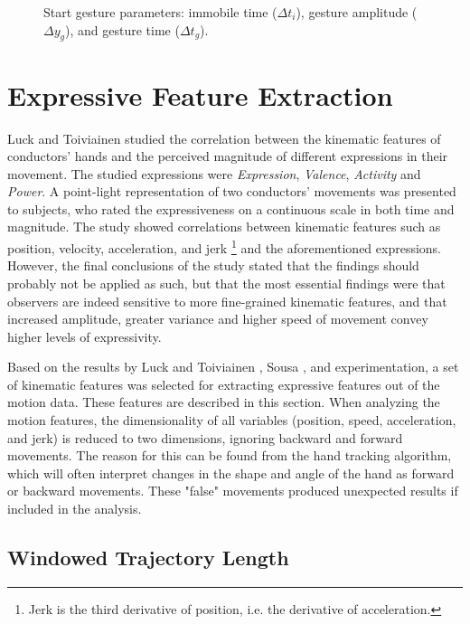 \begin{figure}
\begin{center}

\caption{
Start gesture parameters:
immobile time ($\Delta t_i$),
gesture amplitude ($\Delta y_g$), and
gesture time ($\Delta t_g$).
}
\label{fig:start_gesture}
\end{center}
\end{figure}

\section{Expressive Feature Extraction}
\label{sec:expressive_feature_extraction}

Luck and Toiviainen \cite{luck2010}
studied the correlation between the kinematic features of conductors' hands
and the perceived magnitude of different expressions in their movement.
The studied expressions were
\textit{Expression}, \textit{Valence}, \textit{Activity} and \textit{Power}.
A point-light representation of two conductors' movements
was presented to subjects, who rated the expressiveness
on a continuous scale in both time and magnitude.
The study showed correlations between kinematic features
such as position, velocity, acceleration, and jerk%
\footnote{Jerk is the third derivative of position,
i.e. the derivative of acceleration.}
and the aforementioned expressions.
However, the final conclusions of the study stated that
the findings should probably not be applied as such,
but that the most essential findings were that observers
are indeed sensitive to more fine-grained kinematic features,
and that increased amplitude, greater variance and higher speed of movement
convey higher levels of expressivity.

Based on the results by Luck and Toiviainen \cite{luck2010},
Sousa \cite{sousa1988},
and experimentation,
a set of kinematic features was selected for extracting
expressive features out of the motion data.
These features are described in this section.
When analyzing the motion features,
the dimensionality of all variables
(position, speed, acceleration, and jerk)
is reduced to two dimensions,
ignoring backward and forward movements.
The reason for this can be found from the
hand tracking algorithm,
which will often interpret changes in
the shape and angle of the hand
as forward or backward movements.
These "false" movements produced unexpected
results if included in the analysis.

\subsection*{Windowed Trajectory Length}

